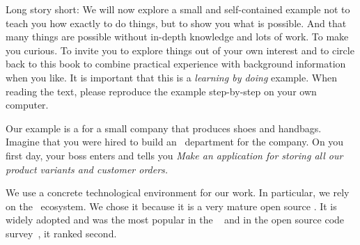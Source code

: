Long story short:
We will now explore a small and self-contained example not to teach you how exactly to do things, but to show you what is possible.
And that many things are possible without in-depth knowledge and lots of work.
To make you curious.
To invite you to explore things out of your own interest and to circle back to this book to combine practical experience with background information when you like.
It is important that this is a \emph{learning by doing} example.
When reading the text, please reproduce the example step-by-step on your own computer.

Our example is a  for a small company that produces shoes and handbags.
Imagine that you were hired to build an ~department for the company.
On you first day, your boss enters and tells you \emph{Make an application for storing all our product variants and customer orders.}

We use a concrete technological environment for our work.
In particular, we rely on the \postgresql\ ecosystem.
We chose it because it is a very mature open source .
It is widely adopted and was the most popular  in the ~\cite{SE:SO:2024DS} and in the open source code survey~\cite{PMPVEPWGSMB2025ATAODMSTTHOOSP}, it ranked second.%
%
%
%
